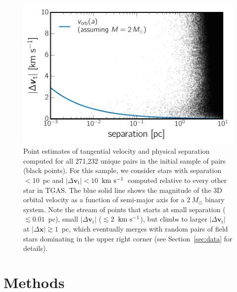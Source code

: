 \documentclass[manuscript, letterpaper]{aastex6}
\newcommand{\acronym}[1]{{\small{#1}}}
\newcommand{\sectionname}{Section}
\newcommand{\tgas}{\acronym{TGAS}}
\newcommand{\bs}[1]{\boldsymbol{#1}}
\renewcommand{\vec}[1]{\bs{#1}}
\newcommand{\kms}{\ensuremath{\rm km~s^{-1}}}
\newcommand{\absdvtan}{\ensuremath{|\Delta\vec v_\mathrm{t}|}}
\begin{document}
\begin{figure}[htbp]
  \begin{center}
    \includegraphics[width=\linewidth]{figures/sep_dvtan.pdf}
  \end{center}
  \caption{%
    Point estimates of tangential velocity and physical separation computed for
    all 271,232 unique pairs in the initial sample of pairs (black points).
    For this sample, we consider stars
    with separation $< 10$~pc and $\absdvtan < 10$~\kms\
    computed relative to every other star in \tgas.
    The blue solid line shows the magnitude of the 3D
    orbital velocity as a function of semi-major axis for a $2~M_\odot$ binary system.
    Note the stream of points that starts at small separation ($\lesssim 0.01$~pc),
    small $\absdvtan$ ($\lesssim 2$~\kms),
    but climbs to larger $\absdvtan$ at $|\Delta \vec{x}|\gtrsim 1$~pc, which
    eventually merges with random pairs of field stars dominating in the upper right corner
    (see \sectionname~\ref{sec:data} for details).
    \label{fig:dv-sep}}
\end{figure}

\section{Methods} \label{sec:methods}
\end{document}
